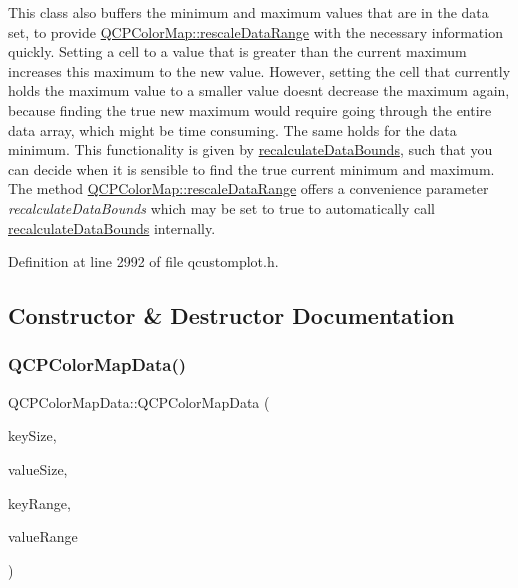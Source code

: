 This class also buffers the minimum and maximum values that are in the data set, to provide \hyperlink{class_q_c_p_color_map_a856608fa3dd1cc290bcd5f29a5575774}{Q\+C\+P\+Color\+Map\+::rescale\+Data\+Range} with the necessary information quickly. Setting a cell to a value that is greater than the current maximum increases this maximum to the new value. However, setting the cell that currently holds the maximum value to a smaller value doesn\textquotesingle{}t decrease the maximum again, because finding the true new maximum would require going through the entire data array, which might be time consuming. The same holds for the data minimum. This functionality is given by \hyperlink{class_q_c_p_color_map_data_ab235ade8a4d64bd3adb26a99b3dd57ee}{recalculate\+Data\+Bounds}, such that you can decide when it is sensible to find the true current minimum and maximum. The method \hyperlink{class_q_c_p_color_map_a856608fa3dd1cc290bcd5f29a5575774}{Q\+C\+P\+Color\+Map\+::rescale\+Data\+Range} offers a convenience parameter {\itshape recalculate\+Data\+Bounds} which may be set to true to automatically call \hyperlink{class_q_c_p_color_map_data_ab235ade8a4d64bd3adb26a99b3dd57ee}{recalculate\+Data\+Bounds} internally. 

Definition at line 2992 of file qcustomplot.\+h.



\subsection{Constructor \& Destructor Documentation}
\mbox{\label{class_q_c_p_color_map_data_aac9d8eb81e18e240d89d56c01933fd23}} 
\subsubsection{\texorpdfstring{Q\+C\+P\+Color\+Map\+Data()}{QCPColorMapData()}\hspace{0.1cm}{\footnotesize\ttfamily [1/2]}}
{\footnotesize\ttfamily Q\+C\+P\+Color\+Map\+Data\+::\+Q\+C\+P\+Color\+Map\+Data (\begin{DoxyParamCaption}\item[{int}]{key\+Size,  }\item[{int}]{value\+Size,  }\item[{const \hyperlink{class_q_c_p_range}{Q\+C\+P\+Range} \&}]{key\+Range,  }\item[{const \hyperlink{class_q_c_p_range}{Q\+C\+P\+Range} \&}]{value\+Range }\end{DoxyParamCaption})}

